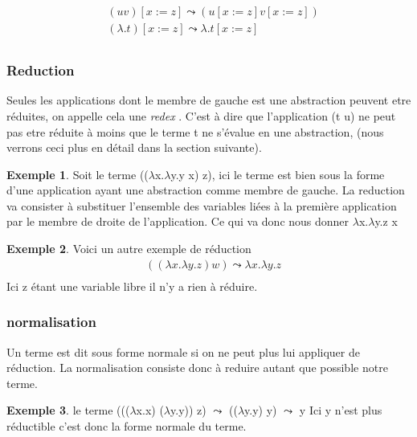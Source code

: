 \documentclass {article}
\theoremstyle{definition}
\newtheorem{example}{Exemple}
\theoremstyle{remark}
\begin{document}
\begin{align*}
&(u v)[x := z]\leadsto(u[x := z] v[x := z]) \\
&(\lambda .t)[x := z]\leadsto\lambda .t[x := z] \\
\end{align*}

\subsubsection{Reduction}

Seules les applications dont le membre de gauche est une abstraction
peuvent etre réduites, on appelle cela une \emph{redex} . 
C'est à dire que l'application (t u) ne peut pas etre réduite à moins 
que le terme t ne s'évalue en une abstraction, (nous verrons ceci plus
en détail dans la section suivante).

\begin{example}
  Soit le terme ((\(\lambda\)x.\(\lambda\)y.y x) z), ici
  le terme est bien sous la forme d'une application ayant une abstraction comme 
  membre de gauche. La reduction va consister à substituer l'ensemble des 
  variables liées à la première application par le membre de droite de 
  l'application. Ce qui va donc nous donner \(\lambda\)x.\(\lambda\)y.z x
\end{example}

\begin{example}
  Voici un autre exemple de réduction
  \begin{align*}
    & ((\lambda x .\lambda y. z) w) \leadsto \lambda x.\lambda y.z \\
  \end{align*}
  Ici z étant une variable libre il n'y a rien à réduire.
\end{example}


\subsubsection{normalisation}

Un terme est dit sous forme normale si on ne peut plus lui appliquer 
de réduction. La normalisation consiste donc à reduire autant que possible
notre terme.
\begin{example}
  le terme (((\(\lambda\)x.x) (\(\lambda\)y.y)) z) \(\leadsto\) ((\(\lambda\)y.y) y) 
\(\leadsto\) y %
  Ici y n'est plus réductible c'est donc la forme normale du terme.
\end{example}
\end{document}
